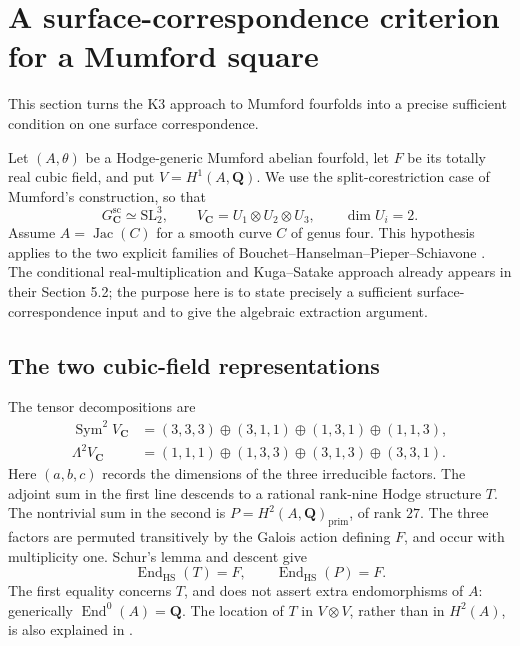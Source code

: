 \section{A surface-correspondence criterion for a Mumford square}
\label{sec:mfg-surface-gate}

This section turns the K3 approach to Mumford fourfolds into a precise sufficient condition on one surface correspondence.

Let $(A,\theta)$ be a Hodge-generic Mumford abelian fourfold, let $F$ be
its totally real cubic field, and put $V=H^1(A,\mathbf Q)$.  We use the
split-corestriction case of Mumford's construction, so that
\[
 G^{\mathrm{sc}}_{\mathbf C}\simeq\mathrm{SL}_2^3,
 \qquad V_{\mathbf C}=U_1\otimes U_2\otimes U_3,
 \qquad \dim U_i=2.
\]
Assume $A=\operatorname{Jac}(C)$ for a smooth curve $C$ of genus four.
This hypothesis applies to the two explicit families of
Bouchet--Hanselman--Pieper--Schiavone
\cite[Theorem 1.2]{BHPS}.  The conditional real-multiplication and
Kuga--Satake approach already appears in their Section 5.2; the purpose
here is to state precisely a sufficient surface-correspondence input
and to give the algebraic extraction argument.

\subsection{The two cubic-field representations}

The tensor decompositions are
\begin{align*}
 \operatorname{Sym}^2V_{\mathbf C}
  &=(3,3,3)\oplus(3,1,1)\oplus(1,3,1)\oplus(1,1,3),\\
 \Lambda^2V_{\mathbf C}
  &=(1,1,1)\oplus(1,3,3)\oplus(3,1,3)\oplus(3,3,1).
\end{align*}
Here $(a,b,c)$ records the dimensions of the three irreducible factors.
The adjoint sum in the first line descends to a rational rank-nine
Hodge structure $T$.  The nontrivial sum in the second is
$P=H^2(A,\mathbf Q)_{\mathrm{prim}}$, of rank $27$.
The three factors are permuted transitively by the Galois action defining
$F$, and occur with multiplicity one.  Schur's lemma and descent give
\[
 \operatorname{End}_{\mathrm{HS}}(T)=F,
 \qquad \operatorname{End}_{\mathrm{HS}}(P)=F.
\]
The first equality concerns $T$, and does not assert extra endomorphisms
of $A$: generically $\operatorname{End}^0(A)=\mathbf Q$.
The location of $T$ in $V\otimes V$, rather than in $H^2(A)$, is also
explained in \cite[Section 2.3]{Zhu}.

